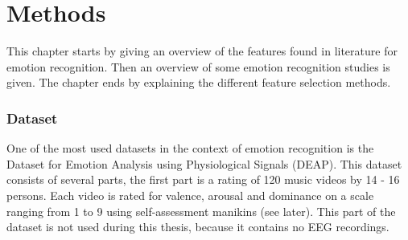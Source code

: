 \chapter{Methods}
{\samenvatting This chapter starts by giving an overview of the features found in literature for emotion recognition. Then an overview of some emotion recognition studies is given. The chapter ends by explaining the different feature selection methods.}



\subsection{Dataset}
One of the most used datasets in the context of emotion recognition is the Dataset for Emotion Analysis using Physiological Signals (DEAP)\cite{DEAP}. This dataset consists of several parts, the first part is a rating of 120 music videos by 14 - 16 persons. Each video is rated for valence, arousal and dominance on a scale ranging from 1 to 9 using self-assessment manikins (see later). This part of the dataset is not used during this thesis, because it contains no EEG recordings.

